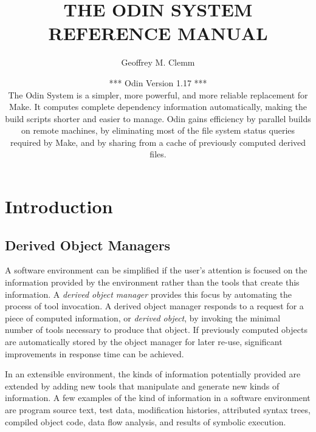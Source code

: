 \topmargin -0.25in
\textheight 8.75in
\oddsidemargin 0.0in
\textwidth 6.5in
\addtocounter{tocdepth}{1}
\addtocounter{secnumdepth}{1}
\newcommand{\ex}{\tt}   %
\title{
        THE ODIN SYSTEM\\ \vspace{.5in}
        REFERENCE MANUAL
        }
\author{Geoffrey M. Clemm}
\date{
*** Odin Version 1.17 ***\\
The Odin System is a simpler, more powerful, and more reliable
replacement for Make.  It computes complete dependency information
automatically, making the build scripts shorter and easier to manage.
Odin gains efficiency by parallel builds on remote machines,
by eliminating most of the file system status queries required
by Make, and by sharing from a cache of previously computed derived files.
}



\maketitle

\tableofcontents


\chapter{Introduction}
\label{intro}


\section{Derived Object Managers}

A software environment can be simplified if the
user's attention is focused on the information provided by the environment
rather than the tools that create this information.
A {\em derived object manager} provides this focus
by automating the process of tool invocation.
A derived object manager responds to a request for a piece of computed
information,
or {\em derived object}, by invoking the minimal number of tools
necessary to produce that object.
If previously computed objects are automatically stored by the object manager
for later re-use, significant improvements in response time can be achieved.

In an extensible environment, the kinds of information potentially
provided are extended by adding
new tools that manipulate and generate new kinds of information.
A few examples of the kind of information in a software environment
are program source text, test data, modification histories,
attributed syntax trees, compiled object code, data flow analysis,
and results of symbolic execution.

